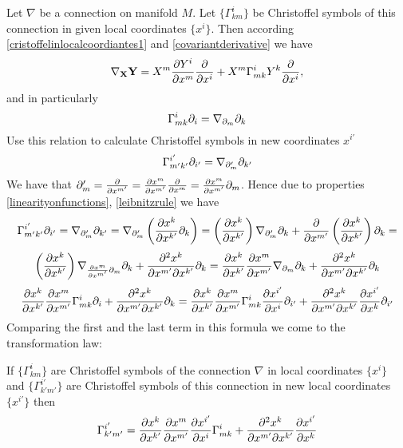 \documentclass[12pt]{article}
\theoremstyle{theorem}
\numberwithin{equation}{section}
\begin{document}
 Let $\nabla$ be a connection on manifold $M$.
  Let $\{\Gamma^i_{km}\}$ be Christoffel symbols of this connection in  given local coordinates $\{x^i\}$.
  Then according \eqref{cristoffelinlocalcoordiantes1} and \eqref{covariantderivative} we have
                 $$
              \nabla_{\bf X}{\bf Y}=X^m{\partial Y^i\over \partial x^m}{\partial\over \partial x^i}+X^m\Gamma^i_{mk}Y^k{\partial\over \partial x^i},
                 $$
and in particularly
               $$
               \Gamma^i_{mk}\partial_i=\nabla_{\partial_m}\partial_k
               $$
  Use this relation to calculate Christoffel symbols in new coordinates $x^{i'}$
               $$
            \Gamma^{i'}_{m'k'}\partial_{i'}=
            \nabla_{\partial_m'}\partial_{k'}
               $$
  We have that $\partial_m'={\partial\over \partial x^{m'}}={\partial x^m\over \partial x^{m'}}{\partial\over \partial x^{m}}= {\partial x^m\over \partial x^{m'}}\partial_m $.
  Hence due to properties \eqref{linearityonfunctions}, \eqref{leibnitzrule} we have
    $$
          \Gamma^{i'}_{m'k'}\partial_{i'}=
            \nabla_{\partial_m'}\partial_{k'}=\nabla_{\partial_m'}\left({\partial x^k\over \partial x^{k'}}\partial_{k}\right)=
            \left({\partial x^k\over \partial x^{k'}}\right)\nabla_{\partial_m'}\partial_{k}+
            {\partial\over \partial x^{m'}}\left({\partial x^k\over \partial x^{k'}}\right)\partial_{k}=
    $$
              $$
    \left({\partial x^k\over \partial x^{k'}}\right)\nabla_{{\partial x^m\over \partial x^{m'}}\partial_m}\partial_{k}+
            {\partial^2  x^k\over \partial x^{m'}\partial x^{k'}}\partial_{k}=
                      {\partial x^k\over \partial x^{k'}}
          {\partial x^m\over \partial x^{m'}}
          \nabla_{\partial_m}\partial_{k}+
           {\partial^2  x^k\over \partial x^{m'}\partial x^{k'}}\partial_{k}
          $$
          $$
     {\partial x^k\over \partial x^{k'}}
          {\partial x^m\over \partial x^{m'}}
          \Gamma_{mk}^i\partial_i+{\partial^2  x^k\over \partial x^{m'}\partial x^{k'}}\partial_{k}=
          {\partial x^k\over \partial x^{k'}}
          {\partial x^m\over \partial x^{m'}}\Gamma_{mk}^i{\partial x^{i'}\over \partial x^i}\partial_{i'}+
          {\partial^2  x^k\over \partial x^{m'}\partial x^{k'}}{\partial x^{i'}\over \partial x^k}\partial_{i'}
          $$
Comparing the first and the last term in this formula we come to the transformation law:

\m

If $\{\Gamma^i_{km}\}$ are Christoffel symbols of the connection $\nabla$ in  local coordinates $\{x^i\}$
and $\{\Gamma^{i'}_{k'm'}\}$ are Christoffel symbols of this connection  in  new local coordinates $\{x^{i'}\}$
then
 \begin{equation}\label{formualfortransformationofconnection}
    \Gamma^{i'}_{k'm'}=
          {\partial x^k\over \partial x^{k'}}
          {\partial x^m\over \partial x^{m'}}
          {\partial x^{i'}\over \partial x^i}
          \Gamma_{mk}^i+
    {\partial^2  x^k\over \partial x^{m'}\partial x^{k'}}{\partial x^{i'}\over \partial x^k}
 \end{equation}
\end{document}

